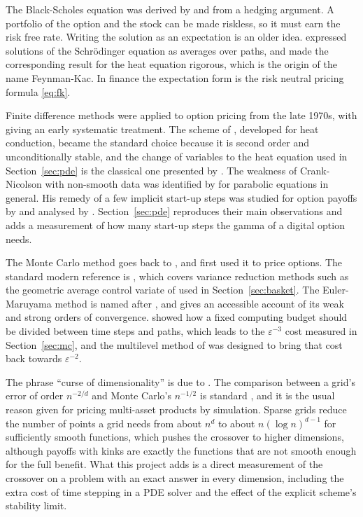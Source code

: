 \documentclass[11pt,a4paper]{article}
\begin{document}
The Black-Scholes equation was derived by \citet{black1973} and \citet{merton1973} from a hedging argument. A portfolio of the option and the stock can be made riskless, so it must earn the risk free rate. Writing the solution as an expectation is an older idea. \citet{feynman1948} expressed solutions of the Schr\"odinger equation as averages over paths, and \citet{kac1949} made the corresponding result for the heat equation rigorous, which is the origin of the name Feynman-Kac. In finance the expectation form is the risk neutral pricing formula \eqref{eq:fk}.

Finite difference methods were applied to option pricing from the late 1970s, with \citet{brennan1978} giving an early systematic treatment. The scheme of \citet{crank1947}, developed for heat conduction, became the standard choice because it is second order and unconditionally stable, and the change of variables to the heat equation used in Section~\ref{sec:pde} is the classical one presented by \citet{wilmott1995}. The weakness of Crank-Nicolson with non-smooth data was identified by \citet{rannacher1984} for parabolic equations in general. His remedy of a few implicit start-up steps was studied for option payoffs by \citet{pooley2003} and analysed by \citet{giles2006}. Section~\ref{sec:pde} reproduces their main observations and adds a measurement of how many start-up steps the gamma of a digital option needs.

The Monte Carlo method goes back to \citet{metropolis1949}, and \citet{boyle1977} first used it to price options. The standard modern reference is \citet{glasserman2004}, which covers variance reduction methods such as the geometric average control variate of \citet{kemna1990} used in Section~\ref{sec:basket}. The Euler-Maruyama method is named after \citet{maruyama1955}, and \citet{higham2001} gives an accessible account of its weak and strong orders of convergence. \citet{duffie1995} showed how a fixed computing budget should be divided between time steps and paths, which leads to the $\varepsilon^{-3}$ cost measured in Section~\ref{sec:mc}, and the multilevel method of \citet{giles2008} was designed to bring that cost back towards $\varepsilon^{-2}$.

The phrase ``curse of dimensionality'' is due to \citet{bellman1957}. The comparison between a grid's error of order $n^{-2/d}$ and Monte Carlo's $n^{-1/2}$ is standard \citep[Section 1.1]{glasserman2004}, and it is the usual reason given for pricing multi-asset products by simulation. Sparse grids \citep{bungartz2004} reduce the number of points a grid needs from about $n^d$ to about $n(\log n)^{d-1}$ for sufficiently smooth functions, which pushes the crossover to higher dimensions, although payoffs with kinks are exactly the functions that are not smooth enough for the full benefit. What this project adds is a direct measurement of the crossover on a problem with an exact answer in every dimension, including the extra cost of time stepping in a PDE solver and the effect of the explicit scheme's stability limit.
\end{document}
